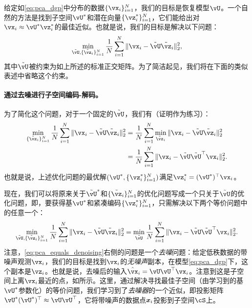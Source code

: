 \documentclass[../../book-main.tex]{subfiles}
\begin{document}
给定如\eqref{eq:pca_dgp}中分布的数据\(\{\vx_{i}\}_{i = 1}^{N}\)，我们的目标是恢复模型\(\vU\)。一个自然的方法是找到子空间\(\vU^{\ast}\)和潜在向量\(\{\vz_{i}^{\ast}\}_{i = 1}^{N}\)，它们能给出对\(\vx_{i} \approx \vU^{\ast}\vz_{i}^{\ast}\)的最佳近似。也就是说，我们的目标是解决以下问题：
\begin{equation}\label{eq:pca_sparse_recovery_problem}
    \min_{\tilde{\vU}, \{\tilde{\vz}_{i}\}_{i = 1}^{N}}\frac{1}{N}\sum_{i = 1}^{N}\norm{\vx_{i} - \tilde{\vU}\tilde{\vz}_{i}}_{2}^{2},
\end{equation}
其中\(\tilde{\vU}\)被约束为如上所述的标准正交矩阵。为了简洁起见，我们将在下面的类似表述中省略这个约束。

\paragraph{通过去噪进行子空间编码-解码。}
为了简化这个问题，对于一个固定的\(\tilde{\vU}\)，我们有（证明作为练习）：
\begin{align}
    \min_{\{\tilde{\vz}_{i}\}_{i = 1}^{N}}\frac{1}{N}\sum_{i = 1}^{N}\norm{\vx_{i} - \tilde{\vU}\tilde{\vz}_{i}}_{2}^{2} 
    &= \frac{1}{N}\sum_{i = 1}^{N}\min_{\tilde{\vz}_{i}}\norm{\vx_{i} - \tilde{\vU}\tilde{\vz}_{i}}_{2}^{2} \\
    &= \frac{1}{N}\sum_{i = 1}^{N}\norm{\vx_{i} - \tilde{\vU}\tilde{\vU}^{\top}\vx_{i}}_{2}^{2}. 
\end{align}
也就是说，上述优化问题的最优解\((\vU^{\ast}, \{\vz_{i}^{\ast}\}_{i = 1}^{N})\)满足$\vz_i^{\ast} = (\vU^{\ast})^\top\vx_i$。

现在，我们可以将原来关于\(\tilde{\vU}^{\ast}\)和\(\{\tilde{\vz}_{i}\}_{i = 1}^{N}\)的优化问题写成一个只关于\(\tilde{\vU}\)的优化问题，即，要获得基\(\vU^{\ast}\)和紧凑编码\(\{\vz_{i}^{\ast}\}_{i = 1}^{N}\)，只需解决以下两个等价问题中的任意一个：
\begin{equation}\label{eq:pca_equals_denoising}
    \min_{\tilde{\vU}, \{\tilde{\vz}_{i}\}_{i = 1}^{N}}\frac{1}{N}\sum_{i = 1}^{N}\norm{\vx_{i} - \tilde{\vU}\tilde{\vz}_{i}}_{2}^{2} = \min_{\tilde{\vU}}\frac{1}{N}\sum_{i = 1}^{N}\norm{\vx_{i} - \tilde{\vU}\tilde{\vU}^{\top}\vx_{i}}_{2}^{2}.
\end{equation}
注意，\eqref{eq:pca_equals_denoising}右侧的问题是一个\textit{去噪}问题：给定低秩数据的带噪声观测\(\vx_{i}\)，我们的目标是找到\(\vx_{i}\)的\textit{无噪声}副本，在模型\eqref{eq:pca_dgp}下，这个副本是$\vz_{i}$。也就是说，去噪后的输入$\hat{\vx}_i = \vU\vU^\top \vx_i$。注意到这是子空间上离$\vx_i$最近的点，如所示。这里，通过解决寻找最佳子空间（由学习到的基\(\vU^{\ast}\)参数化）的等价问题，我们学习到了\textit{去噪器}的一个近似，即投影矩阵\(\vU^{\ast}(\vU^{\ast})^{\top} \approx \vU\vU^{\top}\)，它将带噪声的数据点$\bm{x}_i$投影到子空间\(\cS\)上。%
\end{document}
